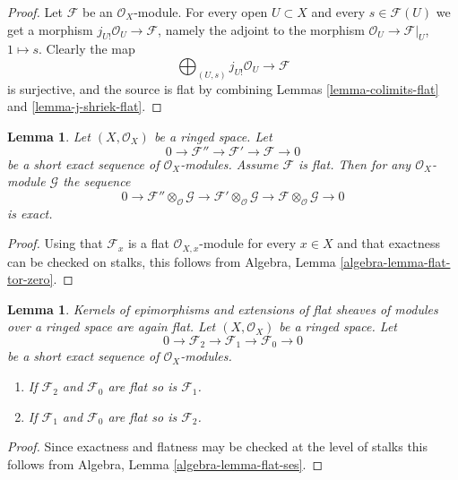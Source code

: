 \documentclass{stacks-project}
\newenvironment{slogan}{\comment}{\endcomment}
\theoremstyle{plain}
\newtheorem{lemma}[subsection]{Lemma}
\theoremstyle{definition}
\theoremstyle{remark}
\numberwithin{equation}{subsection}
\begin{document}
\begin{proof}
Let $\mathcal{F}$ be an $\mathcal{O}_X$-module.
For every open $U \subset X$ and every
$s \in \mathcal{F}(U)$ we get a morphism
$j_{U!}\mathcal{O}_U \to \mathcal{F}$, namely the adjoint to
the morphism $\mathcal{O}_U \to \mathcal{F}|_U$, $1 \mapsto s$.
Clearly the map
$$
\bigoplus\nolimits_{(U, s)} j_{U!}\mathcal{O}_U
\longrightarrow
\mathcal{F}
$$
is surjective, and the source is flat by combining Lemmas
\ref{lemma-colimits-flat} and \ref{lemma-j-shriek-flat}.
\end{proof}

\begin{lemma}
\label{lemma-flat-tor-zero}
Let $(X, \mathcal{O}_X)$ be a ringed space.
Let
$$
0 \to \mathcal{F}'' \to \mathcal{F}' \to \mathcal{F} \to 0
$$
be a short exact sequence of $\mathcal{O}_X$-modules.
Assume $\mathcal{F}$ is flat. Then for any $\mathcal{O}_X$-module
$\mathcal{G}$ the sequence
$$
0 \to
\mathcal{F}'' \otimes_\mathcal{O} \mathcal{G} \to
\mathcal{F}' \otimes_\mathcal{O} \mathcal{G} \to
\mathcal{F} \otimes_\mathcal{O} \mathcal{G} \to 0
$$
is exact.
\end{lemma}

\begin{proof}
Using that $\mathcal{F}_x$ is a flat $\mathcal{O}_{X, x}$-module
for every $x \in X$ and that exactness can be checked on stalks, this
follows from
Algebra, Lemma \ref{algebra-lemma-flat-tor-zero}.
\end{proof}

\begin{lemma}
\label{lemma-flat-ses}
\begin{slogan}
Kernels of epimorphisms and extensions of flat sheaves of modules over
a ringed space are again flat.
\end{slogan}
Let $(X, \mathcal{O}_X)$ be a ringed space.
Let
$$
0 \to
\mathcal{F}_2 \to
\mathcal{F}_1 \to
\mathcal{F}_0 \to 0
$$
be a short exact sequence of $\mathcal{O}_X$-modules.
\begin{enumerate}
\item If $\mathcal{F}_2$ and $\mathcal{F}_0$ are flat so is
$\mathcal{F}_1$.
\item If $\mathcal{F}_1$ and $\mathcal{F}_0$ are flat so is
$\mathcal{F}_2$.
\end{enumerate}
\end{lemma}

\begin{proof}
Since exactness and flatness may be checked at the level of stalks
this follows from
Algebra, Lemma \ref{algebra-lemma-flat-ses}.
\end{proof}
\end{document}
